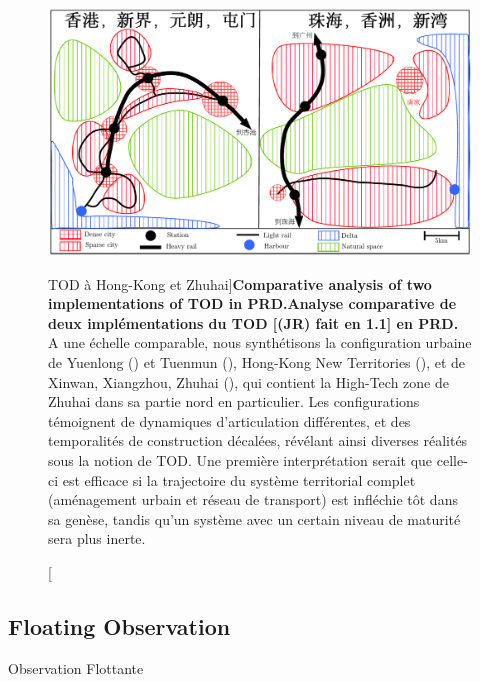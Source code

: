 \begin{figure}
	\includegraphics[width=\linewidth]{Figures/Qualitative/tod}
	\caption[TOD in Hong-Kong and Zhuhai][TOD à Hong-Kong et Zhuhai]{\textbf{Comparative analysis of two implementations of TOD in PRD.}\label{fig:qualitative:schema}}{\textbf{Analyse comparative de deux implémentations du TOD [(JR) fait en 1.1] en PRD.} A une échelle comparable, nous synthétisons la configuration urbaine de Yuenlong () et Tuenmun (), Hong-Kong New Territories (), et de Xinwan, Xiangzhou, Zhuhai (), qui contient la High-Tech zone de Zhuhai dans sa partie nord en particulier. Les configurations témoignent de dynamiques d'articulation différentes, et des temporalités de construction décalées, révélant ainsi diverses réalités sous la notion de TOD. Une première interprétation serait que celle-ci est efficace si la trajectoire du système territorial complet (aménagement urbain et réseau de transport) est infléchie tôt dans sa genèse, tandis qu'un système avec un certain niveau de maturité sera plus inerte.\label{fig:qualitative:schema}}
\end{figure}





\subsection{Floating Observation}{Observation Flottante}


